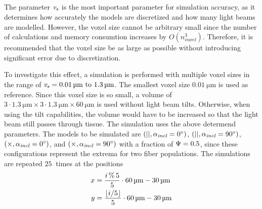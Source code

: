 \subsection{\Voxelsize{} \texorpdfstring{\voxelsize{}}{}}
%
The parameter \Voxelsize{} $\textnormal{$\mathit{v_{s}}$}$ is the most important parameter for simulation accuracy, as it determines how accurately the models are discretized and how many light beams are modelled.
However, the voxel size cannot be arbitrary small since the number of calculations and memory consumtion increases by $O(n_{\mathit{voxel}}^3)$.
Therefore, it is recommended that the voxel size be as large as possible without introducing significant error due to discretization.
\par
%
To investigate this effect, a simulation is performed with multiple voxel sizes in the range of $\voxelsize = \SIrange{0.01}{1.3}{\micro\meter}$.
The smallest voxel size $\SI{0.01}{\micro\meter}$ is used as reference.
Since this voxel size is so small, a volume of $3 \cdot \SI{1.3}{\micro\meter} \times 3 \cdot \SI{1.3}{\micro\meter} \times \SI{60}{\micro\meter}$ is used without light beam tilts.
Otherwise, when using the tilt capabilities, the volume would have to be increased so that the light beam still passes through tissue.
The simulation uses the above determend parameters.
The models to be simulated are $(||,\textnormal{$\alpha_{\mathit{incl}}$} = \SI{0}{\degree})$, $(||,\textnormal{$\alpha_{\mathit{incl}}$} = \SI{90}{\degree})$, $(\times, \textnormal{$\alpha_{\mathit{incl}}$} = \SI{0}{\degree})$, and $(\times,\textnormal{$\alpha_{\mathit{incl}}$} = \SI{90}{\degree})$ with a fraction of $\textnormal{$\Psi$} = \SI{0.5}{}$, since these configurations represent the extrema for two fiber populations.
The simulations are repeated $\SI{25}{}$ times at the positions
\begin{align}
\begin{split}
    x&=\frac{i\,\%\,5}{5} \cdot \SI{60}{\micro\meter} - \SI{30}{\micro\meter} \\
    y&=\frac{\floor{i/5}}{5} \cdot \SI{60}{\micro\meter} - \SI{30}{\micro\meter} 
\end{split}
\end{align}
% 
% 
% 
